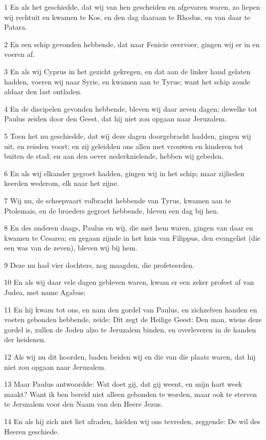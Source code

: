 \par 1 En als het geschiedde, dat wij van hen gescheiden en afgevaren waren, zo liepen wij rechtuit en kwamen te Kos, en den dag daaraan te Rhodus, en van daar te Patara.
\par 2 En een schip gevonden hebbende, dat naar Fenicie overvoer, gingen wij er in en voeren af.
\par 3 En als wij Cyprus in het gezicht gekregen, en dat aan de linker hand gelaten hadden, voeren wij naar Syrie, en kwamen aan te Tyrus; want het schip zoude aldaar den last ontladen.
\par 4 En de discipelen gevonden hebbende, bleven wij daar zeven dagen; dewelke tot Paulus zeiden door den Geest, dat hij niet zou opgaan naar Jeruzalem.
\par 5 Toen het nu geschiedde, dat wij deze dagen doorgebracht hadden, gingen wij uit, en reisden voort; en zij geleidden ons allen met vrouwen en kinderen tot buiten de stad; en aan den oever nederknielende, hebben wij gebeden.
\par 6 En als wij elkander gegroet hadden, gingen wij in het schip; maar zijlieden keerden wederom, elk naar het zijne.
\par 7 Wij nu, de scheepvaart volbracht hebbende van Tyrus, kwamen aan te Ptolemais, en de broeders gegroet hebbende, bleven een dag bij hen.
\par 8 En des anderen daags, Paulus en wij, die met hem waren, gingen van daar en kwamen te Cesarea; en gegaan zijnde in het huis van Filippus, den evangelist (die een was van de zeven), bleven wij bij hem.
\par 9 Deze nu had vier dochters, nog maagden, die profeteerden.
\par 10 En als wij daar vele dagen gebleven waren, kwam er een zeker profeet af van Judea, met name Agabus;
\par 11 En hij kwam tot ons, en nam den gordel van Paulus, en zichzelven handen en voeten gebonden hebbende, zeide: Dit zegt de Heilige Geest: Den man, wiens deze gordel is, zullen de Joden alzo te Jeruzalem binden, en overleveren in de handen der heidenen.
\par 12 Als wij nu dit hoorden, baden beiden wij en die van die plaats waren, dat hij niet zou opgaan naar Jeruzalem.
\par 13 Maar Paulus antwoordde: Wat doet gij, dat gij weent, en mijn hart week maakt? Want ik ben bereid niet alleen gebonden te worden, maar ook te sterven te Jeruzalem voor den Naam van den Heere Jezus.
\par 14 En als hij zich niet liet afraden, hielden wij ons tevreden, zeggende: De wil des Heeren geschiede.
